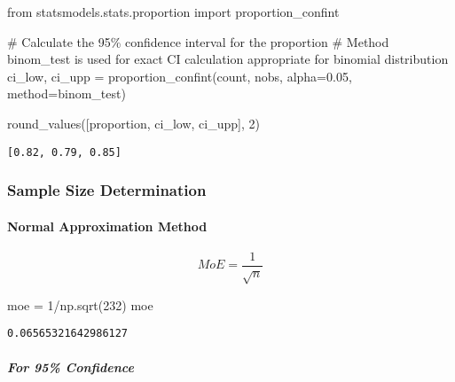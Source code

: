 \documentclass[
  letterpaper,
  DIV=11,
  numbers=noendperiod]{scrartcl}
\let\oldparagraph\paragraph
\renewcommand{\paragraph}[1]{\oldparagraph{#1}\mbox{}}
\let\oldsubparagraph\subparagraph
\renewcommand{\subparagraph}[1]{\oldsubparagraph{#1}\mbox{}}
\newenvironment{Shaded}{\begin{snugshade}}{\end{snugshade}}
\newcommand{\CommentTok}[1]{\textcolor[rgb]{0.37,0.37,0.37}{#1}}
\newcommand{\DecValTok}[1]{\textcolor[rgb]{0.68,0.00,0.00}{#1}}
\newcommand{\FloatTok}[1]{\textcolor[rgb]{0.68,0.00,0.00}{#1}}
\newcommand{\ImportTok}[1]{\textcolor[rgb]{0.00,0.46,0.62}{#1}}
\newcommand{\NormalTok}[1]{\textcolor[rgb]{0.00,0.23,0.31}{#1}}
\newcommand{\OperatorTok}[1]{\textcolor[rgb]{0.37,0.37,0.37}{#1}}
\newcommand{\StringTok}[1]{\textcolor[rgb]{0.13,0.47,0.30}{#1}}
\begin{document}
\begin{Shaded}
\begin{Highlighting}[]
\ImportTok{from}\NormalTok{ statsmodels.stats.proportion }\ImportTok{import}\NormalTok{ proportion\_confint}

\CommentTok{\# Calculate the 95\% confidence interval for the proportion}
\CommentTok{\# Method \textquotesingle{}binom\_test\textquotesingle{} is used for exact CI calculation appropriate for binomial distribution}
\NormalTok{ci\_low, ci\_upp }\OperatorTok{=}\NormalTok{ proportion\_confint(count, nobs, alpha}\OperatorTok{=}\FloatTok{0.05}\NormalTok{, method}\OperatorTok{=}\StringTok{\textquotesingle{}binom\_test\textquotesingle{}}\NormalTok{)}

\NormalTok{round\_values([proportion, ci\_low, ci\_upp], }\DecValTok{2}\NormalTok{)}
\end{Highlighting}
\end{Shaded}

\begin{verbatim}
[0.82, 0.79, 0.85]
\end{verbatim}

\hypertarget{sample-size-determination}{%
\subsubsection{Sample Size
Determination}\label{sample-size-determination}}

\hypertarget{normal-approximation-method-1}{%
\paragraph{Normal Approximation
Method}\label{normal-approximation-method-1}}

\[MoE = \frac{{1}}{\sqrt{n}}\]

\begin{Shaded}
\begin{Highlighting}[]
\NormalTok{moe }\OperatorTok{=} \DecValTok{1}\OperatorTok{/}\NormalTok{np.sqrt(}\DecValTok{232}\NormalTok{)}
\NormalTok{moe}
\end{Highlighting}
\end{Shaded}

\begin{verbatim}
0.06565321642986127
\end{verbatim}

\hypertarget{for-95-confidence}{%
\subparagraph{For 95\% Confidence}\label{for-95-confidence}}
\end{document}
